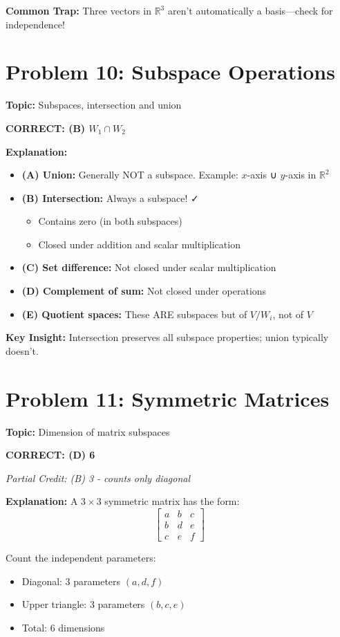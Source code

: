 \documentclass[12pt]{amsart}
\newcommand{\correct}[1]{{\color{blue}\textbf{CORRECT: #1}}}
\newcommand{\partcred}[1]{{\color{red}\textit{Partial Credit: #1}}}
\newcommand{\hint}{\textbf{Key Insight: }}
\newcommand{\trap}{\textbf{Common Trap: }}
\begin{document}
\trap Three vectors in $\mathbb{R}^3$ aren't automatically a basis—check for independence!

\hrulefill

\section*{Problem 10: Subspace Operations}
\textbf{Topic:} Subspaces, intersection and union

\correct{(B) $W_1 \cap W_2$}

\textbf{Explanation:} 
\begin{itemize}
\item \textbf{(A) Union:} Generally NOT a subspace. Example: $x$-axis ∪ $y$-axis in $\mathbb{R}^2$
\item \textbf{(B) Intersection:} Always a subspace! ✓
  \begin{itemize}
  \item Contains zero (in both subspaces)
  \item Closed under addition and scalar multiplication
  \end{itemize}
\item \textbf{(C) Set difference:} Not closed under scalar multiplication
\item \textbf{(D) Complement of sum:} Not closed under operations
\item \textbf{(E) Quotient spaces:} These ARE subspaces but of $V/W_i$, not of $V$
\end{itemize}

\hint Intersection preserves all subspace properties; union typically doesn't.

\hrulefill

\section*{Problem 11: Symmetric Matrices}
\textbf{Topic:} Dimension of matrix subspaces

\correct{(D) 6}

\partcred{(B) 3 - counts only diagonal}

\textbf{Explanation:} A $3 \times 3$ symmetric matrix has the form:
$$\begin{bmatrix} a & b & c \\ b & d & e \\ c & e & f \end{bmatrix}$$

Count the independent parameters:
\begin{itemize}
\item Diagonal: 3 parameters $(a, d, f)$
\item Upper triangle: 3 parameters $(b, c, e)$
\item Total: 6 dimensions
\end{itemize}
\end{document}
